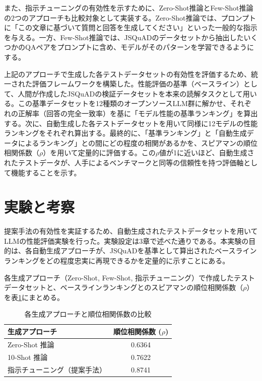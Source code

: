 \documentclass[twocolumn]{jsarticle}
\begin{document}
また、指示チューニングの有効性を示すために、Zero-Shot推論とFew-Shot推論の2つのアプローチも比較対象として実装する。Zero-Shot推論では、プロンプトに「この文章に基づいて質問と回答を生成してください」といった一般的な指示を与える。一方、Few-Shot推論では、JSQuADのデータセットから抽出したいくつかのQAペアをプロンプトに含め、モデルがそのパターンを学習できるようにする。

上記のアプローチで生成した各テストデータセットの有効性を評価するため、統一された評価フレームワークを構築した。性能評価の基準（ベースライン）として、人間が作成したJSQuADの検証データセットを本来の読解タスクとして用いる。この基準データセットを12種類のオープンソースLLM群に解かせ、それぞれの正解率（回答の完全一致率）を基に「モデル性能の基準ランキング」を算出する。次に、自動生成した各テストデータセットを用いて同様に12モデルの性能ランキングをそれぞれ算出する。最終的に、「基準ランキング」と「自動生成データによるランキング」との間にどの程度の相関があるかを、スピアマンの順位相関係数（$\rho$）を用いて定量的に評価する。この$\rho$値が1に近いほど、自動生成されたテストデータが、人手によるベンチマークと同等の信頼性を持つ評価軸として機能することを示す。



\section{実験と考察}

提案手法の有効性を実証するため、自動生成されたテストデータセットを用いてLLMの性能評価実験を行った。実験設定は3章で述べた通りである。本実験の目的は、各自動生成アプローチが、JSQuAD\cite{JSQuAD}を基準として算出されたベースラインランキングをどの程度忠実に再現できるかを定量的に示すことにある。

各生成アプローチ（Zero-Shot, Few-Shot, 指示チューニング）で作成したテストデータセットと、ベースラインランキングとのスピアマンの順位相関係数（$\rho$）を表\ref{tab:rho_summary}にまとめる。

\begin{table}[h]
  \centering
  \caption{各生成アプローチと順位相関係数の比較}
  \label{tab:rho_summary}
  \begin{tabular}{lc}
  \hline
  生成アプローチ       & 順位相関係数 ($\rho$) \\
  \hline
  Zero-Shot 推論       & 0.6364                     \\
  10-Shot 推論         & 0.7622                     \\
  指示チューニング（提案手法） & 0.8741                     \\
  \hline
  \end{tabular}
\end{table}
\end{document}
